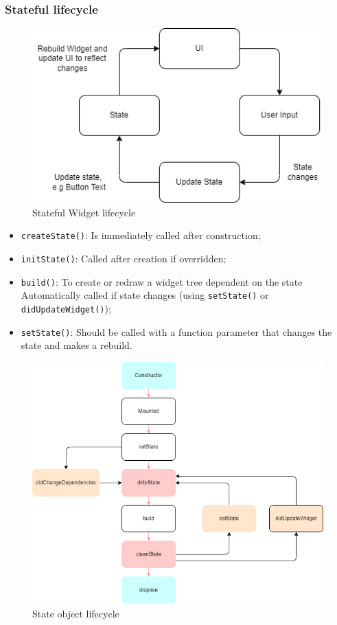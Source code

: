 \subsubsection{Stateful lifecycle}

\begin{figure}[h]
\centering
\includegraphics[width=0.8\linewidth]{figures/09_stateful_widget_lifecycle.png}
\caption{Stateful Widget lifecycle}
\label{fig:stateful_widget_lifecycle}
\end{figure}

\begin{itemize}
    \item \texttt{createState()}: Is immediately called after construction;
    \item \texttt{initState()}: Called after creation if overridden; 
    \item \texttt{build()}: To create or redraw a widget tree dependent on the state
    Automatically called if state changes (using \texttt{setState()} or \texttt{didUpdateWidget()});
    \item \texttt{setState()}: Should be called with a function parameter that 
    changes the state and makes a rebuild. 
\end{itemize}

\begin{figure}[h]
\centering
\includegraphics[width=0.8\linewidth]{figures/09_state_object_lifecycle.png}
\caption{State object lifecycle}
\label{fig:state_object_lifecycle}
\end{figure}

